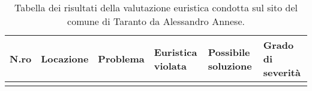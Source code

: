 \begin{longtable}[c]{@{}m{1cm}llllm{2cm}@{}}
	\caption{Tabella dei risultati della valutazione euristica condotta sul sito del comune di Taranto da Alessandro Annese.}
	\label{tab:val-euristica-AlessandroAnnese}\\
	\toprule
	N.ro & Locazione & Problema & Euristica violata & Possibile soluzione & Grado di severità\footnotemark \\* \midrule
	\endhead
\\*
	\bottomrule
\end{longtable}
